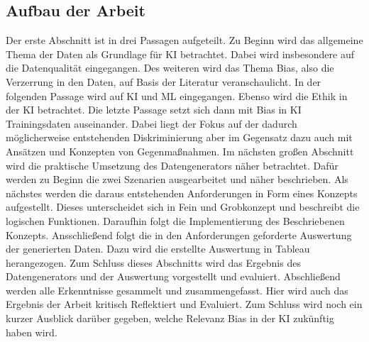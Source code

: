 \begin{onehalfspace}
        \section{Aufbau der Arbeit}
        \label{subsec:aufbau der arbeit}
        Der erste Abschnitt ist in drei Passagen aufgeteilt. Zu Beginn wird das allgemeine Thema der Daten als Grundlage für \ac*{KI} betrachtet. Dabei wird insbesondere auf die Datenqualität eingegangen. Des weiteren wird das Thema Bias, also die Verzerrung in den Daten, auf Basis der Literatur veranschaulicht. In der folgenden Passage wird auf \ac*{KI} und \ac{ML} eingegangen. Ebenso wird die Ethik in der \ac*{KI} betrachtet. Die letzte Passage setzt sich dann mit Bias in \ac*{KI} Trainingsdaten auseinander. Dabei liegt der Fokus auf der dadurch möglicherweise entstehenden Diskriminierung aber im Gegensatz dazu auch mit Ansätzen und Konzepten von Gegenmaßnahmen.
        Im nächsten großen Abschnitt wird die praktische Umsetzung des Datengenerators näher betrachtet. Dafür werden zu Beginn die zwei Szenarien ausgearbeitet und näher beschrieben. Als nächstes werden die daraus entstehenden Anforderungen in Form eines Konzepts aufgestellt. Dieses unterscheidet sich in Fein und Grobkonzept und beschreibt die logischen Funktionen. Daraufhin folgt die Implementierung des Beschriebenen Konzepts. Ansschließend folgt die in den Anforderungen geforderte Auswertung der generierten Daten. Dazu wird die erstellte Auswertung in Tableau herangezogen. Zum Schluss dieses Abschnitts wird das Ergebnis des Datengenerators und der Auswertung vorgestellt und evaluiert.
        Abschließend werden alle Erkenntnisse gesammelt und zusammengefasst. Hier wird auch das Ergebnis der Arbeit kritisch Reflektiert und Evaluiert. Zum Schluss wird noch ein kurzer Ausblick darüber gegeben, welche Relevanz Bias in der \ac*{KI} zukünftig haben wird. 
        \newpage

    \end{onehalfspace}